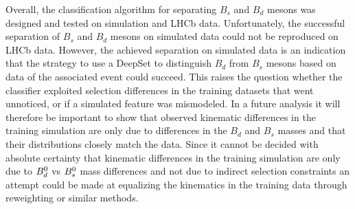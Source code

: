 Overall, the classification algorithm for separating $B_s$ and $B_d$ mesons was designed and tested on simulation and LHCb data. 
Unfortunately, the successful separation of $B_s$ and $B_d$ mesons on simulated data could not be reproduced on LHCb data.
However, the achieved separation on simulated data is an indication that the strategy to use a DeepSet to distinguish $B_d$ from $B_s$ mesons based on data of the associated event could succeed. 
This raises the question whether the classifier exploited selection differences in the training datasets that went unnoticed, or if a simulated feature was mismodeled. 
In a future analysis it will therefore be important to show that observed kinematic differences in the training simulation are only due to differences in the $B_d$ and $B_s$ masses and that their distributions closely match the data. Since it cannot be decided with absolute certainty that kinematic differences in the training simulation are only due to ${{B}^0_{d}}$ vs ${{B}^0_{s}}$ mass differences and not due to indirect selection constraints an attempt could be made at equalizing the kinematics in the training data through reweighting or similar methods.



